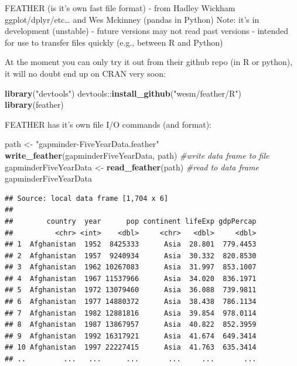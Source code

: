 \documentclass[]{article}
\newenvironment{Shaded}{\begin{snugshade}}{\end{snugshade}}
\newcommand{\KeywordTok}[1]{\textcolor[rgb]{0.13,0.29,0.53}{\textbf{{#1}}}}
\newcommand{\StringTok}[1]{\textcolor[rgb]{0.31,0.60,0.02}{{#1}}}
\newcommand{\CommentTok}[1]{\textcolor[rgb]{0.56,0.35,0.01}{\textit{{#1}}}}
\newcommand{\NormalTok}[1]{{#1}}
\begin{document}
FEATHER (is it's own fast file format) - from Hadley Wickham
ggplot/dplyr/etc\ldots{} and Wes Mckinney (pandas in Python) Note: it's
in development (unstable) - future versions may not read past versions -
intended for use to transfer files quickly (e.g., between R and Python)

At the moment you can only try it out from their github repo (in R or
python), it will no doubt end up on CRAN very soon:

\begin{Shaded}
\begin{Highlighting}[]
\KeywordTok{library}\NormalTok{(}\StringTok{"devtools"}\NormalTok{)}
\NormalTok{devtools::}\KeywordTok{install_github}\NormalTok{(}\StringTok{"wesm/feather/R"}\NormalTok{)}
\KeywordTok{library}\NormalTok{(feather)}
\end{Highlighting}
\end{Shaded}

FEATHER has it's own file I/O commands (and format):

\begin{Shaded}
\begin{Highlighting}[]
\NormalTok{path <-}\StringTok{ "gapminder-FiveYearData.feather"}
\KeywordTok{write_feather}\NormalTok{(gapminderFiveYearData, path) }\CommentTok{#write data frame to file}
\NormalTok{gapminderFiveYearData <-}\StringTok{ }\KeywordTok{read_feather}\NormalTok{(path) }\CommentTok{#read to data frame}
\NormalTok{gapminderFiveYearData}
\end{Highlighting}
\end{Shaded}

\begin{verbatim}
## Source: local data frame [1,704 x 6]
## 
##        country  year      pop continent lifeExp gdpPercap
##          <chr> <int>    <dbl>     <chr>   <dbl>     <dbl>
## 1  Afghanistan  1952  8425333      Asia  28.801  779.4453
## 2  Afghanistan  1957  9240934      Asia  30.332  820.8530
## 3  Afghanistan  1962 10267083      Asia  31.997  853.1007
## 4  Afghanistan  1967 11537966      Asia  34.020  836.1971
## 5  Afghanistan  1972 13079460      Asia  36.088  739.9811
## 6  Afghanistan  1977 14880372      Asia  38.438  786.1134
## 7  Afghanistan  1982 12881816      Asia  39.854  978.0114
## 8  Afghanistan  1987 13867957      Asia  40.822  852.3959
## 9  Afghanistan  1992 16317921      Asia  41.674  649.3414
## 10 Afghanistan  1997 22227415      Asia  41.763  635.3414
## ..         ...   ...      ...       ...     ...       ...
\end{verbatim}
\end{document}
